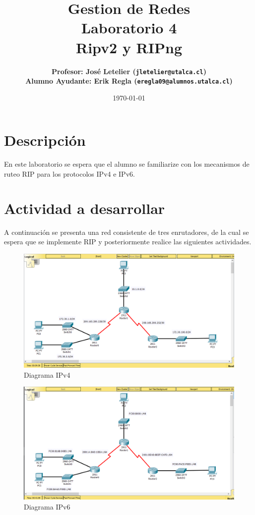 \documentclass[11pt]{utalcaDoc}
\title{{\bf Gestion de Redes}\\Laboratorio 4\\Ripv2 y RIPng}
\author{
    \bf{Profesor:} José Letelier (\texttt{jletelier@utalca.cl})\\ 
    \bf{Alumno Ayudante:} Erik Regla (\texttt{eregla09@alumnos.utalca.cl})\\ }
\date{\today}
\begin{document}
\renewcommand{\figurename}{Figura~}
\renewcommand{\tablename}{Tabla~}

\maketitle

\section{Descripción}
En este laboratorio se espera que el alumno se familiarize con los mecanismos de ruteo RIP para los protocolos IPv4 e IPv6.

\section{Actividad a desarrollar}

A continuación se presenta una red consistente de tres enrutadores, de la cual se espera que se implemente RIP y posteriormente realice las siguientes actividades.

\begin{figure}[!ht]
  \centering
\includegraphics[scale=.3]{ipv4} 
  \caption{Diagrama IPv4}
  \label{FIGURE:1}
\end{figure}

\begin{figure}[!ht]
  \centering
\includegraphics[scale=.3]{ipv6} 
  \caption{Diagrama IPv6}
  \label{FIGURE:2}
\end{figure}
\end{document}
